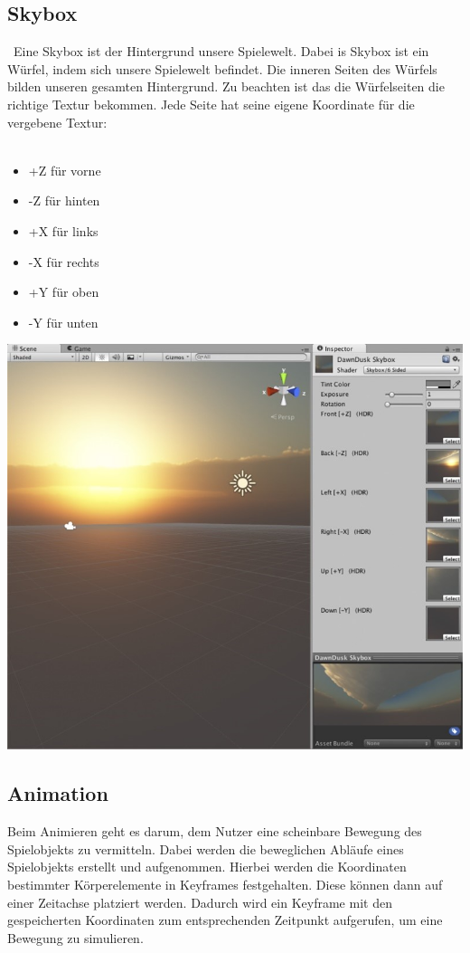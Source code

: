 \pagebreak
{}
\subsection{Skybox}\
Eine Skybox ist der Hintergrund unsere Spielewelt. Dabei is Skybox ist ein Würfel, indem sich unsere Spielewelt befindet. Die inneren Seiten des Würfels bilden unseren gesamten Hintergrund.
Zu beachten ist das die Würfelseiten die richtige Textur bekommen. Jede Seite hat seine eigene Koordinate für die vergebene Textur:\\\\

\begin{minipage}{0.4\textwidth}
    \begin{itemize}
        \item +Z für vorne 
        \item -Z für hinten 
        \item +X für links 
        \item -X für rechts
        \item +Y für oben
        \item -Y für unten
    \end{itemize}
  \end{minipage}
  \hfill
  \begin{minipage}{0.6\textwidth}
    \includegraphics[width=\linewidth]{chapters/14/Images/Skybox.png}
  \end{minipage}

\pagebreak
\subsection{Animation}

Beim Animieren geht es darum, dem Nutzer eine scheinbare Bewegung des Spielobjekts zu vermitteln. Dabei werden die beweglichen Abläufe eines Spielobjekts erstellt und aufgenommen. Hierbei werden die Koordinaten bestimmter Körperelemente in Keyframes festgehalten. Diese können dann auf einer Zeitachse platziert werden. Dadurch wird ein Keyframe mit den gespeicherten Koordinaten zum entsprechenden Zeitpunkt aufgerufen, um eine Bewegung zu simulieren.